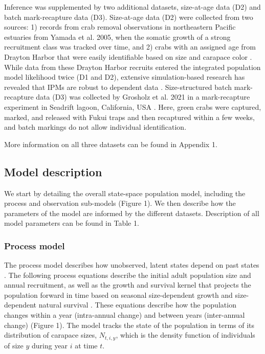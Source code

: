 \documentclass{article}
\begin{document}
Inference was supplemented by two additional datasets, size-at-age data (D2) and batch mark-recapture data (D3). Size-at-age data (D2) were collected from two sources: 1) records from crab removal observations in northeastern Pacific estuaries from Yamada et al. 2005, when the somatic growth of a strong recruitment class was tracked over time, and 2) crabs with an assigned age from Drayton Harbor that were easily identifiable based on size and carapace color \parencite{yamada2005growth}. While data from these Drayton Harbor recruits entered the integrated population model likelihood twice (D1 and D2), extensive simulation-based research has revealed that IPMs are robust to dependent data \parencite{abadi2010assessment}. Size-structured batch mark-recapture data (D3) was collected by Grosholz et al. 2021 in a mark-recapture experiment in Seadrift lagoon, California, USA \parencite{grosholz2021stage}. Here, green crabs were captured, marked, and released with Fukui traps and then recaptured within a few weeks, and batch markings do not allow individual identification. 

More information on all three datasets can be found in Appendix 1. 

\subsection{Model description}

We start by detailing the overall state-space population model, including the process and observation sub-models (Figure 1). We then describe how the parameters of the model are informed by the different datasets. Description of all model parameters can be found in Table 1.

\subsubsection{Process model}

The process model describes how unobserved, latent states depend on past states \parencite{auger2021guide}. The following process equations describe the initial adult population size and annual recruitment, as well as the growth and survival kernel that projects the population forward in time based on seasonal size-dependent growth and size-dependent natural survival \parencite{rees2014building}. These equations describe how the population changes within a year (intra-annual change) and between years (inter-annual change) (Figure 1). The model tracks the state of the population in terms of its distribution of carapace sizes, $N_{t, i, y}$, which is the density function of individuals of size $y$ during year $i$ at time $t$. 
\end{document}
